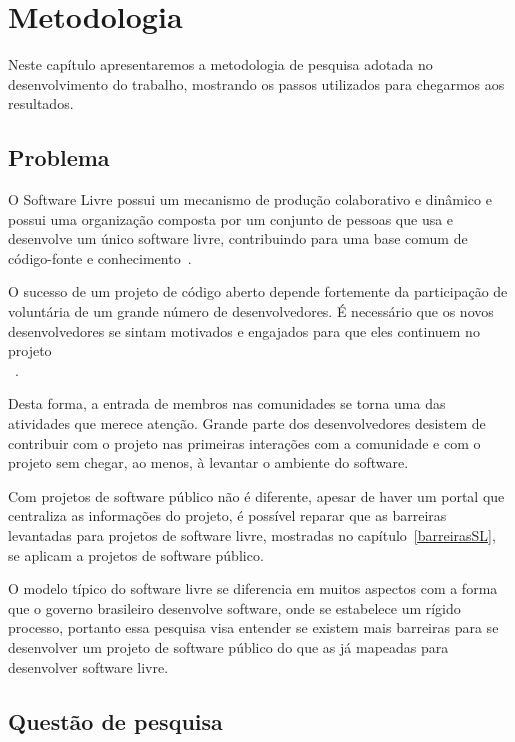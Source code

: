 \chapter{Metodologia}
\label{sec:metodologia}

Neste capítulo apresentaremos a metodologia de pesquisa adotada no desenvolvimento 
do trabalho, mostrando os passos utilizados para chegarmos aos resultados.


\section{Problema}

O Software Livre possui um mecanismo de produção colaborativo e dinâmico 
e possui uma organização composta por um conjunto de pessoas que usa e desenvolve 
um único software livre, contribuindo para uma base comum de código-fonte e 
conhecimento~\cite{reis2003caracterizacc}.

O sucesso de um projeto de código aberto depende fortemente da participação de 
voluntária de um grande número de desenvolvedores. É necessário que os novos 
desenvolvedores se sintam motivados e engajados para que eles continuem no 
projeto\\~\cite{qureshi2010socialization}.

Desta forma, a entrada de membros nas comunidades se torna uma das atividades que
merece atenção. Grande parte dos desenvolvedores desistem de contribuir com o 
projeto nas primeiras interações com a comunidade e com o projeto sem chegar,
ao menos, à levantar o ambiente do software.

Com projetos de software público não é diferente, apesar de haver um portal que
centraliza as informações do projeto, é possível reparar que as barreiras levantadas
para projetos de software livre, mostradas no capítulo~\ref{barreirasSL}, se aplicam
a projetos de software público.

O modelo típico do software livre se diferencia em muitos aspectos 
com a forma que o governo brasileiro desenvolve software, onde se estabelece um 
rígido processo, portanto essa pesquisa visa entender se existem mais barreiras 
para se desenvolver um projeto de software público do que as já mapeadas para 
desenvolver software livre.



\section{Questão de pesquisa}

